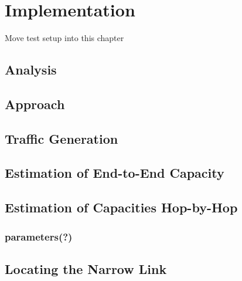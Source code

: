 \chapter{Implementation}
Move test setup into this chapter 

\section{Analysis}

\section{Approach}

\section{Traffic Generation}

\section{Estimation of End-to-End Capacity}

\section{Estimation of Capacities Hop-by-Hop}

\subsection*{parameters(?)}

\section{Locating the Narrow Link}

